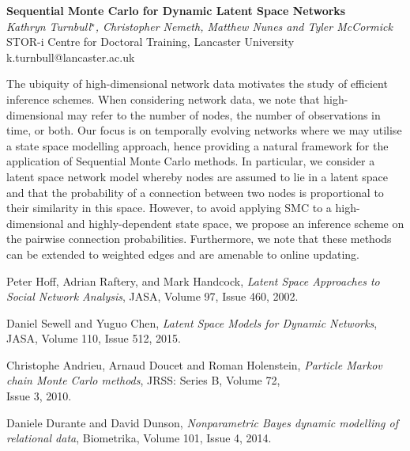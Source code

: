 \documentclass[12pt]{article}
\newcommand{\postertitle}[1]{{\Large\bf #1}\\[12pt]}
\newcommand{\authors}[1]{\emph{#1}\\}
\newcommand{\affiliations}[1]{{#1}\\}
\newcommand{\contacts}[1]{{#1}}
\begin{document}
\begin{center}
\vspace*{0.5cm}
%
\postertitle{Sequential Monte Carlo for Dynamic Latent Space Networks}
%
\authors{Kathryn Turnbull$^\star$, Christopher Nemeth, Matthew Nunes and Tyler McCormick} %
% 
\affiliations{STOR-i Centre for Doctoral Training, Lancaster University}
%
\contacts{k.turnbull@lancaster.ac.uk} %
%
\vspace*{0.3cm}
\end{center}

The ubiquity of high-dimensional network data motivates the study of efficient inference schemes.  When considering network data, we note that high-dimensional may refer to the number of nodes, the number of observations in time, or both. Our focus is on temporally evolving networks where we may utilise a state space modelling approach, hence providing a natural framework for the application of Sequential Monte Carlo methods. In particular, we consider a latent space network model whereby nodes are assumed to lie in a latent space and that the probability of a connection between two nodes is proportional to their similarity in this space. However, to avoid applying SMC to a high-dimensional and highly-dependent state space, we propose an inference scheme on the pairwise connection probabilities. Furthermore, we note that these methods can be extended to weighted edges and are amenable to online updating.

\begin{thebibliography}{1}	

          Peter Hoff, Adrian Raftery, and Mark Handcock,
          \emph{Latent Space Approaches to Social Network Analysis},
          JASA,
          Volume 97, Issue 460,
          2002.

          Daniel Sewell and Yuguo Chen,
          \emph{Latent Space Models for Dynamic Networks},
          JASA,
          Volume 110, Issue 512,
          2015.

          Christophe Andrieu, Arnaud Doucet and Roman Holenstein,
          \emph{Particle Markov chain Monte Carlo methods},
          JRSS: Series B,
          Volume 72,\\ Issue 3,
          2010.

          Daniele Durante and David Dunson,
          \emph{Nonparametric Bayes dynamic modelling of relational data},
          Biometrika,
          Volume 101, Issue 4,
          2014.
	
\end{thebibliography}
\end{document}
